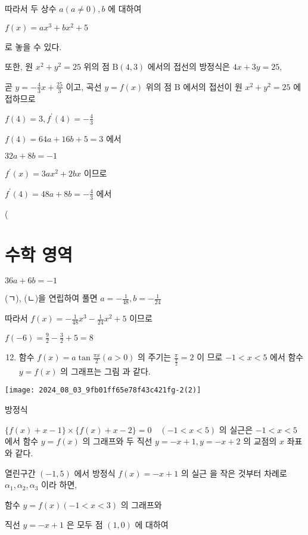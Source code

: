 \documentclass[10pt]{article}
\begin{document}
따라서 두 상수 \(a(a \neq 0), b\) 에 대하여

\(f(x)=a x^{3}+b x^{2}+5\)

로 놓을 수 있다.

또한, 원 \(x^{2}+y^{2}=25\) 위의 점 \(\mathrm{B}(4,3)\) 에서의 접선의 방정식은 \(4 x+3 y=25\),

곧 \(y=-\frac{4}{3} x+\frac{25}{3}\) 이고, 곡선 \(y=f(x)\) 위의 점 B 에서의 접선이 원 \(x^{2}+y^{2}=25\) 에 접하므로

\(f(4)=3, f^{\prime}(4)=-\frac{4}{3}\)

\(f(4)=64 a+16 b+5=3\) 에서

\(32 a+8 b=-1\)

\(f^{\prime}(x)=3 a x^{2}+2 b x\) 이므로

\(f^{\prime}(4)=48 a+8 b=-\frac{4}{3}\) 에서

(

\section*{수학 영역}
\(36 a+6 b=-1\)

(ㄱ), (ㄴ)을 연립하여 풀면 \(a=-\frac{1}{48}, b=-\frac{1}{24}\)

따라서 \(f(x)=-\frac{1}{48} x^{3}-\frac{1}{24} x^{2}+5\) 이므로

\(f(-6)=\frac{9}{2}-\frac{3}{2}+5=8\)

\begin{enumerate}
  \setcounter{enumi}{11}
  \item 함수 \(f(x)=a \tan \frac{\pi x}{2}(a>0)\) 의 주기는 \(\frac{\pi}{\frac{\pi}{2}}=2\) 이 므로 \(-1<x<5\) 에서 함수 \(y=f(x)\) 의 그래프는 그림 과 같다.
\end{enumerate}

\begin{center}
\texttt{[image: 2024\_08\_03\_9fb01ff65e78f43c421fg-2(2)]}
\end{center}

방정식

\(\{f(x)+x-1\} \times\{f(x)+x-2\}=0 \quad(-1<x<5)\) 의 실근은 \(-1<x<5\) 에서 함수 \(y=f(x)\) 의 그래프와 두 직선 \(y=-x+1, y=-x+2\) 의 교점의 \(x\) 좌표와 같다.

열린구간 \((-1,5)\) 에서 방정식 \(f(x)=-x+1\) 의 실근 을 작은 것부터 차례로 \(\alpha_{1}, \alpha_{2}, \alpha_{3}\) 이라 하면,

함수 \(y=f(x)(-1<x<3)\) 의 그래프와

직선 \(y=-x+1\) 은 모두 점 \((1,0)\) 에 대하여
\end{document}
